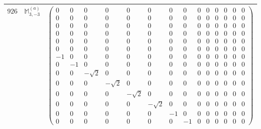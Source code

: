 \documentclass[fleqn,8pt,landscape]{jsarticle}
\begin{document}
\begin{center}
\begin{longtable}{ccc}
$ 926 $ & $ \mathbb{M}_{3,-3}^{(a)} $ & $ \begin{pmatrix} 0 & 0 & 0 & 0 & 0 & 0 & 0 & 0 & 0 & 0 & 0 & 0 & 0 & 0 \\ 0 & 0 & 0 & 0 & 0 & 0 & 0 & 0 & 0 & 0 & 0 & 0 & 0 & 0 \\ 0 & 0 & 0 & 0 & 0 & 0 & 0 & 0 & 0 & 0 & 0 & 0 & 0 & 0 \\ 0 & 0 & 0 & 0 & 0 & 0 & 0 & 0 & 0 & 0 & 0 & 0 & 0 & 0 \\ 0 & 0 & 0 & 0 & 0 & 0 & 0 & 0 & 0 & 0 & 0 & 0 & 0 & 0 \\ 0 & 0 & 0 & 0 & 0 & 0 & 0 & 0 & 0 & 0 & 0 & 0 & 0 & 0 \\ -1 & 0 & 0 & 0 & 0 & 0 & 0 & 0 & 0 & 0 & 0 & 0 & 0 & 0 \\ 0 & -1 & 0 & 0 & 0 & 0 & 0 & 0 & 0 & 0 & 0 & 0 & 0 & 0 \\ 0 & 0 & - \sqrt{2} & 0 & 0 & 0 & 0 & 0 & 0 & 0 & 0 & 0 & 0 & 0 \\ 0 & 0 & 0 & - \sqrt{2} & 0 & 0 & 0 & 0 & 0 & 0 & 0 & 0 & 0 & 0 \\ 0 & 0 & 0 & 0 & - \sqrt{2} & 0 & 0 & 0 & 0 & 0 & 0 & 0 & 0 & 0 \\ 0 & 0 & 0 & 0 & 0 & - \sqrt{2} & 0 & 0 & 0 & 0 & 0 & 0 & 0 & 0 \\ 0 & 0 & 0 & 0 & 0 & 0 & -1 & 0 & 0 & 0 & 0 & 0 & 0 & 0 \\ 0 & 0 & 0 & 0 & 0 & 0 & 0 & -1 & 0 & 0 & 0 & 0 & 0 & 0 \end{pmatrix} $ \\ \hline

\end{longtable}
\end{center}
\end{document}

